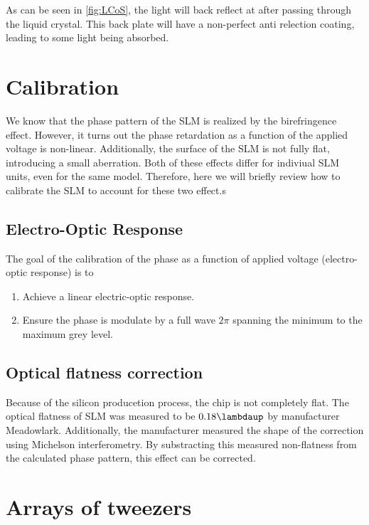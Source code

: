As can be seen in \cref{fig:LCoS}, the light will back reflect at after passing through the liquid crystal. This back plate will have a non-perfect anti relection coating, leading to some light being absorbed. 


\section{Calibration}

We know that the phase pattern of the SLM is realized by the birefringence effect. However, it turns out the phase retardation as a function of the applied voltage is non-linear. Additionally, the surface of the SLM is not fully flat, introducing a small aberration. Both of these effects differ for indiviual SLM units, even for the same model. Therefore, here we will briefly review how to calibrate the SLM to account for these two effect.s 

\subsection{Electro-Optic Response}

The goal of the calibration of the phase as a function of applied voltage (electro-optic response) is to 

\begin{enumerate}
    \item Achieve a linear electric-optic response. 
    \item Ensure the phase is modulate by a full wave $2\pi$ spanning the minimum to the maximum grey level. 
\end{enumerate}

\subsection{Optical flatness correction}

Because of the silicon producetion process, the chip is not completely flat. The optical flatness of SLM was measured to be $0.18\lambdaup$ by manufacturer Meadowlark. Additionally, the manufacturer measured the shape of the correction using Michelson interferometry. By substracting this measured non-flatness from the calculated phase pattern, this effect can be corrected. 


\section{Arrays of tweezers}

